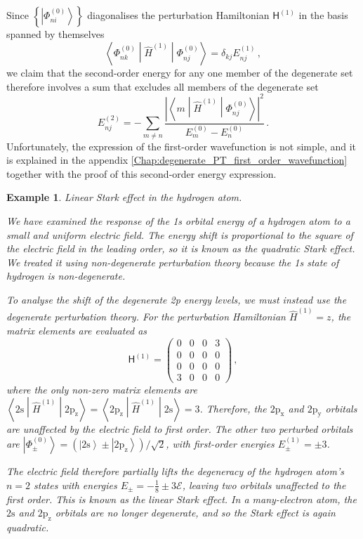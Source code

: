 \documentclass{article}
\theoremstyle{plain}\theoremheaderfont{\normalfont\itshape}\theorembodyfont{\rmfamily}\theoremseparator{.}\newtheorem*{rem}{Remark}\newtheorem*{ex}{Example}\newtheorem*{proof}{Proof}\newtheorem*{altp}{Alternative proof}
\theoremstyle{plain}\theoremheaderfont{\normalfont\bfseries}\theorembodyfont{\rmfamily}\theoremseparator{.}\newtheorem{thm}{Theorem}[section]\newtheorem{lem}[thm]{Lemma}\newtheorem{prop}[thm]{Proposition}\newtheorem*{cor}{Corollary}\newtheorem{defn}[thm]{Definition}\newtheorem{clm}[thm]{Claim}\newtheorem{clminproof}{Claim}
\theoremstyle{break}\theoremheaderfont{\normalfont\itshape}\theorembodyfont{\rmfamily}\theoremseparator{.\medskip}\newtheorem*{proofskip}{Proof}\newtheorem*{exs}{Examples}\newtheorem*{rems}{Remarks}
\theoremstyle{break}\theoremheaderfont{\normalfont\bfseries}\theorembodyfont{\rmfamily}\theoremseparator{.\medskip}\newtheorem{lemskip}[thm]{Lemma}\newtheorem{defnskip}[thm]{Definition}\newtheorem{propskip}[thm]{Proposition}\newtheorem{thmskip}[thm]{Theorem}
\numberwithin{equation}{section}
\newcommand{\ket}[1]{\left| #1 \right\rangle}
\newcommand{\mel}[3]{\left\langle #1 \middle| #2 \middle| #3 \right\rangle}
\newcommand{\abs}[1]{\left| #1 \right|}
\begin{document}
    Since \(\left\{\ket{\Phi_{ni}^{(0)}}\right\}\) diagonalises the perturbation Hamiltonian \(\mathsf{H}^{(1)}\) in the basis spanned by themselves
    \begin{equation}
        \mel{\Phi_{nk}^{(0)}}{\hat{H}^{(1)}}{\Phi_{nj}^{(0)}}=\delta_{kj}E_{nj}^{(1)}\,,
    \end{equation}
    we claim that the second-order energy for any one member of the degenerate set therefore involves a sum that excludes all members of the degenerate set
    \begin{equation}
        E_{nj}^{(2)}=-\sum_{m\ne n}\frac{\abs{\mel{m}{\hat{H}^{(1)}}{\Phi_{nj}^{(0)}}}^2}{E_m^{(0)}-E_n^{(0)}}\,.
    \end{equation}
    Unfortunately, the expression of the first-order wavefunction is not simple, and it is explained in the appendix \cref{Chap:degenerate_PT_first_order_wavefunction} together with the proof of this second-order energy expression.

    \begin{ex}
        \textit{Linear Stark effect in the hydrogen atom.}

        We have examined the response of the 1s orbital energy of a hydrogen atom to a small and uniform electric field. The energy shift is proportional to the square of the electric field in the leading order, so it is known as the \textit{quadratic Stark effect}. We treated it using non-degenerate perturbation theory because the 1s state of hydrogen is non-degenerate.
        
        To analyse the shift of the degenerate 2p energy levels, we must instead use the degenerate perturbation theory. For the perturbation Hamiltonian \(\hat{H}^{(1)}=z\), the matrix elements are evaluated as
        \begin{equation}
            \mathsf{H}^{(1)}=\begin{pmatrix}
                0 & 0 & 0 & 3 \\
                0 & 0 & 0 & 0 \\
                0 & 0 & 0 & 0 \\
                3 & 0 & 0 & 0
            \end{pmatrix}\,,
        \end{equation}
        where the only non-zero matrix elements are \(\mel{2\mathrm{s}}{\hat{H}^{(1)}}{2\mathrm{p_z}}=\mel{2\mathrm{p_z}}{\hat{H}^{(1)}}{2\mathrm{s}}=3\). Therefore, the \(\mathrm{2p_x}\) and \(\mathrm{2p_y}\) orbitals are unaffected by the electric field to first order. The other two perturbed orbitals are \(\ket{\Phi_{\pm}^{(0)}}=(\ket{\mathrm{2s}}\pm\ket{\mathrm{2p_z}})/\sqrt{2}\), with first-order energies \(E_\pm^{(1)}=\pm 3\).

        The electric field therefore partially lifts the degeneracy of the hydrogen atom's \(n=2\) states with energies \(E_\pm=-\frac{1}{8}\pm 3\mathcal{E}\), leaving two orbitals unaffected to the first order. This is known as the \textit{linear Stark effect}. In a many-electron atom, the \(\mathrm{2s}\) and \(\mathrm{2p_z}\) orbitals are no longer degenerate, and so the Stark effect is again quadratic.
    \end{ex}
\end{document}

